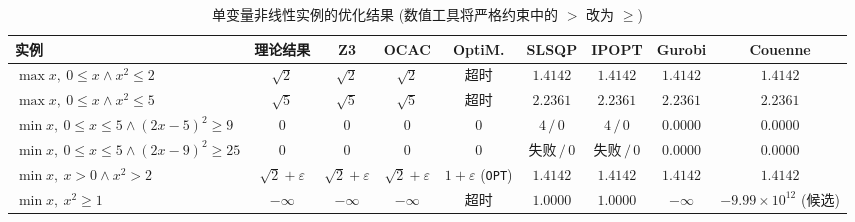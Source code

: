 \begin{table}[!htbp]
\centering
\caption{单变量非线性实例的优化结果 (数值工具将严格约束中的 $>$ 改为 $\ge$)}
\label{tab:exp-nra}
\footnotesize
\setlength{\tabcolsep}{2pt}
\begin{tabular}{@{}l*{8}{c}@{}}
\toprule
\textbf{实例} & \textbf{理论结果} & \textbf{Z3} & \textbf{OCAC} & \textbf{OptiM.} & \textbf{SLSQP} & \textbf{IPOPT} & \textbf{Gurobi} & \textbf{Couenne} \\
\midrule
$\max x,\ 0{\le}x \wedge x^2{\le}2$ & $\sqrt2$ & $\sqrt2$ & $\sqrt2$ & 超时 & $1.4142$ & $1.4142$ & $1.4142$ & $1.4142$ \\
$\max x,\ 0{\le}x \wedge x^2{\le}5$ & $\sqrt5$ & $\sqrt5$ & $\sqrt5$ & 超时 & $2.2361$ & $2.2361$ & $2.2361$ & $2.2361$ \\
$\min x,\ 0{\le}x{\le}5 \wedge (2x{-}5)^2{\ge}9$ & $0$ & $0$ & $0$ & $0$ & $4\,/\,0$ & $4\,/\,0$ & $0.0000$ & $0.0000$ \\
$\min x,\ 0{\le}x{\le}5 \wedge (2x{-}9)^2{\ge}25$ & $0$ & $0$ & $0$ & $0$ & $\text{失败}\,/\,0$ & $\text{失败}\,/\,0$ & $0.0000$ & $0.0000$ \\
$\min x,\ x{>}0 \wedge x^2{>}2$ & $\sqrt2+\varepsilon$ & $\sqrt2+\varepsilon$ & $\sqrt2+\varepsilon$ & $1+\varepsilon$ (\texttt{OPT}) & $1.4142$ & $1.4142$ & $1.4142$ & $1.4142$ \\
$\min x,\ x^2{\ge}1$ & $-\infty$ & $-\infty$ & $-\infty$ & 超时 & $1.0000$ & $1.0000$ & $-\infty$ & $-9.99\times10^{12}$ (候选) \\
\bottomrule
\end{tabular}
\end{table}
